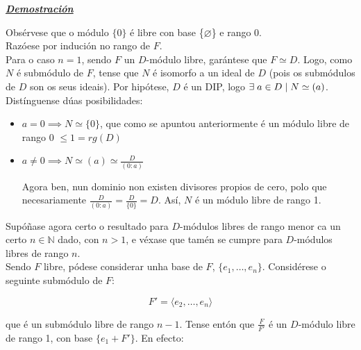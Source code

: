 \documentclass[twoside]{report}
\theoremstyle{mystyle}
\begin{document}
\noindent \textbf{\textit{\underline{Demostración}}}

\vspace{2mm}

\noindent Obsérvese que o módulo $\{0\}$ é libre con base \{$\varnothing$\} e rango 0.\\

\noindent Razóese por indución no rango de $F$.\\

\noindent Para o caso $n = 1$, sendo $F$ un $D$-módulo libre, garántese que $F \simeq D$. Logo, como $N$ é submódulo de $F$, tense que $N$ é isomorfo a un ideal de $D$ (pois os submódulos de $D$ son os seus ideais). Por hipótese, $D$ é un DIP, logo $\exists \hspace{1mm} a \in D \hspace{1mm} | \hspace{1mm} N \simeq (a)$. Distínguense dúas posibilidades:

\begin{itemize}
    \item $a = 0 \implies N \simeq \{0\}$, que como se apuntou anteriormente é un módulo libre de rango 0 $\leq 1 = rg(D)$
    \item $a \neq 0 \implies N \simeq (a) \simeq \displaystyle \frac{D}{(0 : a)}$
    
    Agora ben, nun dominio non existen divisores propios de cero, polo que necesariamente $\displaystyle \frac{D}{(0:a)} = \frac{D}{\{0\}} = D$. Así, $N$ é un módulo libre de rango 1.\\
\end{itemize}

\noindent  Supóñase agora certo o resultado para $D$-módulos libres de rango menor ca un certo $n \in \mathbb{N}$ dado, con $n > 1$, e véxase que tamén se cumpre para $D$-módulos libres de rango $n$.\\

\noindent Sendo $F$ libre, pódese considerar unha base de $F$, $\{e_{1}, \dots, e_{n}\}$. Considérese o seguinte submódulo de $F$:

$$F' = \langle e_{2}, \dots, e_{n} \rangle$$

\noindent que é un submódulo libre de rango $n-1$. Tense entón que $\displaystyle \frac{F}{F'}$ é un $D$-módulo libre de rango 1, con base $\{e_{1} + F'\}$. En efecto:
\end{document}
